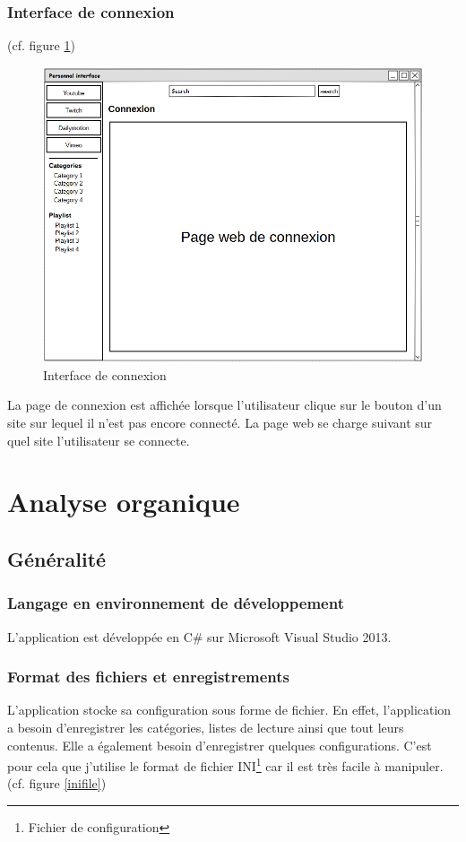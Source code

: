 \documentclass[11pt]{report} %
\begin{document}
		\subsection{Interface de connexion}
		(cf. figure \ref{interfaceconnexion})
		\begin{figure}[h]
			\center
			\includegraphics[width=1\textwidth]{../img/connexionInterface.png}
			\caption{Interface de connexion}
			\label{interfaceconnexion}
		\end{figure}
		
		La page de connexion est affichée lorsque l'utilisateur clique sur le bouton d'un site sur lequel il n'est pas encore connecté. La page web se charge suivant sur quel site l'utilisateur se connecte.
		
\chapter{Analyse organique}
	\section{Généralité}
		\subsection{Langage en environnement de développement}
		L'application est développée en C\# sur Microsoft Visual Studio 2013. 
		
		\subsection{Format des fichiers et enregistrements}
		L'application stocke sa configuration sous forme de fichier. En effet, l'application a besoin d'enregistrer les catégories, listes de lecture ainsi que tout leurs contenus. Elle a également besoin d'enregistrer quelques configurations. C'est pour cela que j'utilise le format de fichier INI\footnote{Fichier de configuration} car il est très facile à manipuler. (cf. figure \ref{inifile})
		
\end{document}
